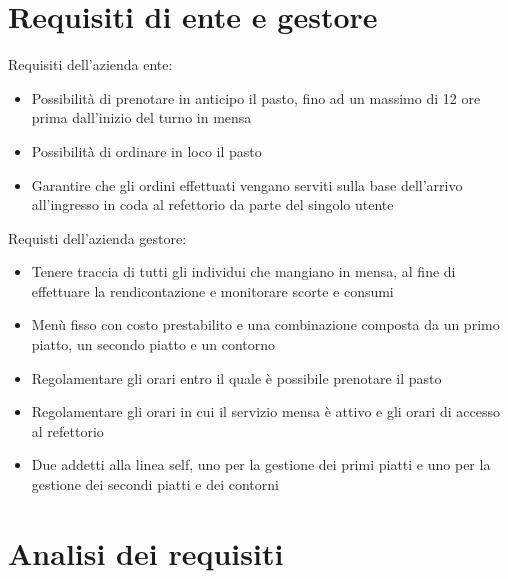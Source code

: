 \documentclass[a4paper, titlepage, 12pt, openright, twoside]{book}
\begin{document}
\section{Requisiti di ente e gestore}

Requisiti dell'azienda ente:
\begin{itemize}
	\item Possibilità di prenotare in anticipo il pasto, fino ad un massimo di 12 ore prima dall'inizio del turno in mensa
	\item Possibilità di ordinare in loco il pasto
	\item Garantire che gli ordini effettuati vengano serviti sulla base dell'arrivo all'ingresso in coda al refettorio da parte del singolo utente
\end{itemize}

Requisti dell'azienda gestore:
\begin{itemize}
	\item Tenere traccia di tutti gli individui che mangiano in mensa, al fine di effettuare la rendicontazione e monitorare scorte e consumi
	\item Menù fisso con costo prestabilito e una combinazione composta da un primo piatto, un secondo piatto e un contorno
	\item Regolamentare gli orari entro il quale è possibile prenotare il pasto
	\item Regolamentare gli orari in cui il servizio mensa è attivo e gli orari di accesso al refettorio
	\item Due addetti alla linea self, uno per la gestione dei primi piatti e uno per la gestione dei secondi piatti e dei contorni
\end{itemize}

\section{Analisi dei requisiti}
\end{document}
